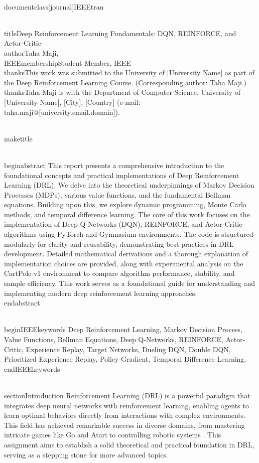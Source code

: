 \\documentclass[journal]{IEEEtran}
\begin{document}
\\title{Deep Reinforcement Learning Fundamentals: DQN, REINFORCE, and Actor-Critic}
\\author{Taha Maji, \\IEEEmembership{Student Member, IEEE}
\\thanks{This work was submitted to the University of [University Name] as part of the Deep Reinforcement Learning Course. (Corresponding author: Taha Maji.)}
\\thanks{Taha Maji is with the Department of Computer Science, University of [University Name], [City], [Country] (e-mail: taha.maji@[university.email.domain]).}}

\\maketitle

\\begin{abstract}
This report presents a comprehensive introduction to the foundational concepts and practical implementations of Deep Reinforcement Learning (DRL). We delve into the theoretical underpinnings of Markov Decision Processes (MDPs), various value functions, and the fundamental Bellman equations. Building upon this, we explore dynamic programming, Monte Carlo methods, and temporal difference learning. The core of this work focuses on the implementation of Deep Q-Networks (DQN), REINFORCE, and Actor-Critic algorithms using PyTorch and Gymnasium environments. The code is structured modularly for clarity and reusability, demonstrating best practices in DRL development. Detailed mathematical derivations and a thorough explanation of implementation choices are provided, along with experimental analysis on the CartPole-v1 environment to compare algorithm performance, stability, and sample efficiency. This work serves as a foundational guide for understanding and implementing modern deep reinforcement learning approaches.
\\end{abstract}

\\begin{IEEEkeywords}
Deep Reinforcement Learning, Markov Decision Process, Value Functions, Bellman Equations, Deep Q-Networks, REINFORCE, Actor-Critic, Experience Replay, Target Networks, Dueling DQN, Double DQN, Prioritized Experience Replay, Policy Gradient, Temporal Difference Learning.
\\end{IEEEkeywords}

\\section{Introduction}
 Reinforcement Learning (DRL) is a powerful paradigm that integrates deep neural networks with reinforcement learning, enabling agents to learn optimal behaviors directly from interactions with complex environments. This field has achieved remarkable success in diverse domains, from mastering intricate games like Go \cite{silver2016mastering} and Atari \cite{mnih2015human} to controlling robotic systems \cite{levine2016end}. This assignment aims to establish a solid theoretical and practical foundation in DRL, serving as a stepping stone for more advanced topics.
\end{document}
